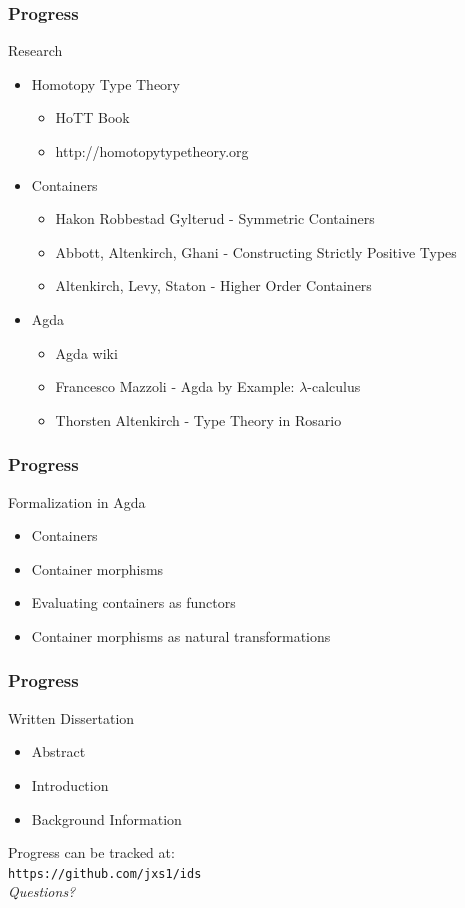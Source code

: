 \documentclass{beamer}
\begin{document}
\begin{frame}
\frametitle{Progress}
\begin{block}{Research}
\begin{itemize}
\item Homotopy Type Theory
\begin{itemize}
\item HoTT Book
\item http://homotopytypetheory.org
\end{itemize}
\item Containers
\begin{itemize}
\item Hakon Robbestad Gylterud - Symmetric Containers
\item Abbott, Altenkirch, Ghani - Constructing Strictly Positive Types
\item Altenkirch, Levy, Staton - Higher Order Containers
\end{itemize}
\item Agda
\begin{itemize}
\item Agda wiki
\item Francesco Mazzoli - Agda by Example: $\lambda$-calculus
\item Thorsten Altenkirch - Type Theory in Rosario
\end{itemize}
\end{itemize}
\end{block}
\end{frame}

\begin{frame}
\frametitle{Progress}

\begin{block}{Formalization in Agda}
\begin{itemize}
\item Containers
\item Container morphisms
\item Evaluating containers as functors
\item Container morphisms as natural transformations
\end{itemize}
\end{block}
\end{frame}

\begin{frame}
\frametitle{Progress}
\begin{block}{Written Dissertation}
\begin{itemize}
\item Abstract
\item Introduction
\item Background Information
\end{itemize}
\end{block}

\end{frame}

\begin{frame}
\begin{center}
Progress can be tracked at:\\
\texttt{https://github.com/jxs1/ids}\\
\bigskip
\Huge{\textit{Questions?}}
\end{center}

\end{frame}

\end{document}
